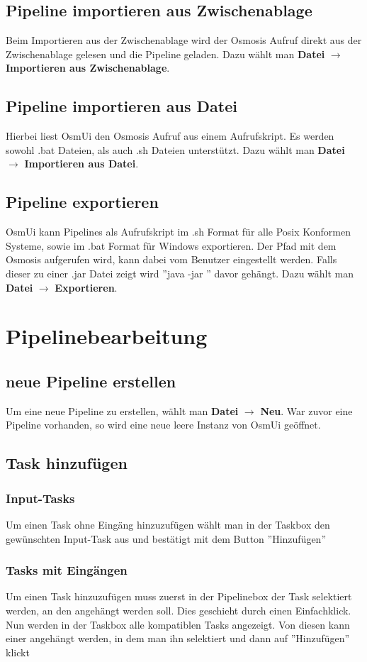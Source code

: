 \documentclass[a4paper,10pt]{scrartcl}
\begin{document}
\subsection{Pipeline importieren aus Zwischenablage}
Beim Importieren aus der Zwischenablage wird der Osmosis Aufruf direkt aus der
Zwischenablage gelesen und die Pipeline geladen. Dazu wählt man \textbf{Datei} $\rightarrow$ \textbf{Importieren aus Zwischenablage}.
\subsection{Pipeline importieren aus Datei}
Hierbei liest OsmUi den Osmosis Aufruf aus einem Aufrufskript. Es werden sowohl .bat
Dateien, als auch .sh Dateien unterstützt. Dazu wählt man \textbf{Datei} $\rightarrow$ \textbf{Importieren aus Datei}.
\subsection{Pipeline exportieren}
OsmUi kann Pipelines als Aufrufskript im .sh Format für alle Posix Konformen Systeme, sowie im .bat Format für Windows exportieren. Der Pfad mit dem Osmosis aufgerufen wird, kann dabei vom Benutzer eingestellt werden. Falls dieser zu einer .jar Datei zeigt wird ''java -jar ” davor gehängt. Dazu wählt man \textbf{Datei} $\rightarrow$ \textbf{Exportieren}.


\section{Pipelinebearbeitung}
\subsection{neue Pipeline erstellen}
Um eine neue Pipeline zu erstellen, wählt man \textbf{Datei} $\rightarrow$ \textbf{Neu}. War zuvor eine Pipeline vorhanden, so wird eine neue leere Instanz von OsmUi geöffnet.

\subsection{Task hinzufügen}
\subsubsection{Input-Tasks}
Um einen Task ohne Eingäng hinzuzufügen wählt man in der Taskbox den gewünschten Input-Task aus und bestätigt mit dem Button ''Hinzufügen''
\subsubsection{Tasks mit Eingängen}
Um einen Task hinzuzufügen muss zuerst in der Pipelinebox der Task selektiert werden, an den angehängt werden soll. Dies geschieht durch einen Einfachklick. Nun werden in der Taskbox alle kompatiblen Tasks angezeigt. Von diesen kann einer angehängt werden, in dem man ihn selektiert und dann auf ''Hinzufügen'' klickt
\end{document}
